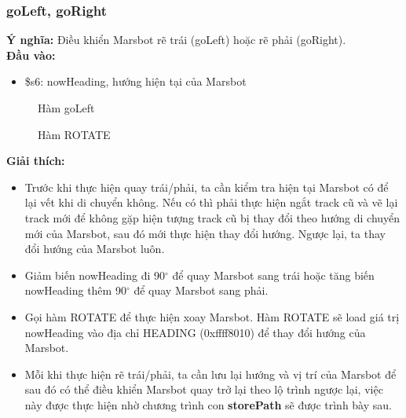 \documentclass[a4paper,12pt]{article}
\begin{document}
	\subsubsection{goLeft, goRight}
	    \textbf{Ý nghĩa:} Điều khiển Marsbot rẽ trái (goLeft) hoặc rẽ phải (goRight).\\
	    \textbf{Đầu vào:} 
	    \begin{itemize}
            \item \$s6: nowHeading, hướng hiện tại của Marsbot
        \end{itemize}
        \FloatBarrier
        \begin{figure}[ht!]
    	    \centerline{}
    	    \caption{Hàm goLeft}
    	    \label{fig:bai100}
        \end{figure}
        \begin{figure}[ht!]
    	    \centerline{}
    	    \caption{Hàm ROTATE}
    	    \label{fig:bai100}
        \end{figure}
        \noindent
	    \textbf{Giải thích:} 
	    \begin{itemize}
	        \item Trước khi thực hiện quay trái/phải, ta cần kiểm tra hiện tại Marsbot có để lại vết khi di chuyển không. Nếu có thì phải thực hiện ngắt track cũ và vẽ lại track mới để không gặp hiện tượng track cũ bị thay đổi theo hướng di chuyển mới của Marsbot, sau đó mới thực hiện thay đổi hướng. Ngược lại, ta thay đổi hướng của Marsbot luôn.
	        \item Giảm biến nowHeading đi 90$^{\circ}$ để quay Marsbot sang trái hoặc tăng biến nowHeading thêm 90$^{\circ}$ để quay Marsbot sang phải.
	        \item Gọi hàm ROTATE để thực hiện xoay Marsbot. Hàm ROTATE sẽ load giá trị nowHeading vào địa chỉ HEADING (0xffff8010) để thay đổi hướng của Marsbot.
	        \item Mỗi khi thực hiện rẽ trái/phải, ta cần lưu lại hướng và vị trí của Marsbot để sau đó có thể điều khiển Marsbot quay trở lại theo lộ trình ngược lại, việc này được thực hiện nhờ chương trình con \textbf{storePath} sẽ được trình bày sau.
	    \end{itemize} 
	\clearpage
\end{document}
